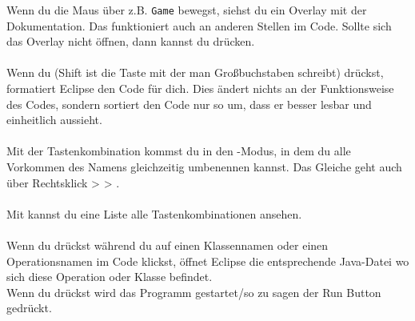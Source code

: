 \begin{Infobox}
    Wenn du die Maus über z.B. \lstinline{Game} bewegst, siehst du ein Overlay mit der Dokumentation.
	Das funktioniert auch an anderen Stellen im Code. Sollte sich das Overlay nicht öffnen, dann kannst du  drücken.\\
	\\
	Wenn du  (Shift ist die Taste mit der man Großbuchstaben schreibt) drückst, formatiert Eclipse den Code für dich.
	Dies ändert nichts an der Funktionsweise des Codes, sondern sortiert den Code nur so um, dass er besser lesbar und einheitlich aussieht.\\
	\\
	Mit der Tastenkombination  kommst du in den -Modus, in dem du alle Vorkommen des Namens gleichzeitig umbenennen kannst.
	Das Gleiche geht auch über Rechtsklick >  > .\\
	\\
	Mit  kannst du eine Liste alle Tastenkombinationen ansehen.\\
	\\
	Wenn du  drückst während du auf einen Klassennamen oder einen Operationsnamen im Code klickst, öffnet Eclipse die entsprechende Java-Datei wo sich diese Operation oder Klasse befindet.\\
	Wenn du  drückst wird das Programm gestartet/so zu sagen der Run Button gedrückt.
\end{Infobox}

\newpage
